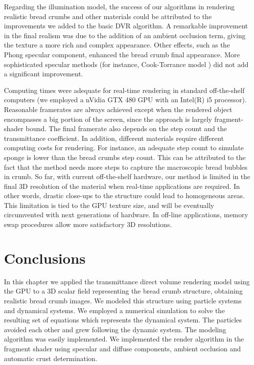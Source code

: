 Regarding the illumination model, the success of our algorithms in rendering realistic bread crumbs and other materials could be attributed to the improvements we added to the basic DVR algorithm.
A remarkable improvement in the final realism was due to the addition of an ambient occlusion term, giving the texture a more rich and complex appearance.
Other effects, such as the Phong specular component, enhanced the bread crumb final appearance.
More sophisticated specular methods (for instance, Cook-Torrance model \cite{Cook1982}) did not add a significant improvement.

Computing times were adequate for real-time rendering in standard off-the-shelf computers (we employed a nVidia GTX 480 GPU with an Intel(R) i5 processor).
Reasonable framerates are always achieved except when the rendered object encompasses a big portion of the screen, since the approach is largely fragment-shader bound.
The final framerate also depends on the step count and the transmittance coefficient.
In addition, different materials require different computing costs for rendering.
For instance, an adequate step count to simulate sponge is lower than the bread crumbs step count.
This can be attributed to the fact that the method needs more steps to capture the macroscopic bread bubbles in crumb.
So far, with current off-the-shelf hardware, our method is limited in the final 3D resolution of the material when real-time applications are required.
In other words, drastic close-ups to the structure could lead to homogeneous areas.
This limitation is tied to the GPU texture size, and will be eventually circumvented with next generations of hardware.
In off-line applications, memory swap procedures allow more satisfactory 3D resolutions.


\section*{Conclusions}

In this chapter we applied the transmittance direct volume rendering model using the GPU to a 3D scalar field representing the bread crumb structure, obtaining realistic bread crumb images.
We modeled this structure using particle systems and dynamical systems.
We employed a numerical simulation to solve the resulting set of equations which represents the dynamical system. 
The particles avoided each other and grew following the dynamic system.
The modeling algorithm was easily implemented. 
We implemented the render algorithm in the fragment shader using specular and diffuse components, ambient occlusion and automatic crust determination.

